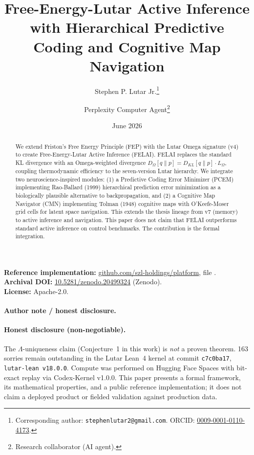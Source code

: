 \documentclass[11pt]{article}
\title{Free-Energy-Lutar Active Inference with Hierarchical Predictive Coding and Cognitive Map Navigation}
\author[1]{Stephen P. Lutar Jr.\thanks{Corresponding author: \texttt{stephenlutar2@gmail.com}. ORCID: \href{https://orcid.org/0009-0001-0110-4173}{0009-0001-0110-4173}.}}
\author[2]{Perplexity Computer Agent\thanks{Research collaborator (AI agent).}}
\affil[1]{SZL Holdings, New York, NY, USA}
\affil[2]{Perplexity}
\date{June 2026}
\theoremstyle{plain}
\begin{document}
\maketitle

\begin{abstract}
We extend Friston's Free Energy Principle (FEP) with the Lutar Omega signature (v4) to create Free-Energy-Lutar Active Inference (FELAI). FELAI replaces the standard KL divergence with an Omega-weighted divergence \( D_\Omega[q \| p] = D_{KL}[q \| p] \cdot L_\Omega \), coupling thermodynamic efficiency to the seven-version Lutar hierarchy. We integrate two neuroscience-inspired modules: (1) a Predictive Coding Error Minimizer (PCEM) implementing Rao-Ballard (1999) hierarchical prediction error minimization as a biologically plausible alternative to backpropagation, and (2) a Cognitive Map Navigator (CMN) implementing Tolman (1948) cognitive maps with O'Keefe-Moser grid cells for latent space navigation. This extends the thesis lineage from v7 (memory) to active inference and navigation. This paper does not claim that FELAI outperforms standard active inference on control benchmarks. The contribution is the formal integration.
\end{abstract}

\noindent\textbf{Reference implementation:} \href{https://github.com/szl-holdings/platform}{github.com/szl-holdings/platform}, file .\\
\textbf{Archival DOI:} \href{https://doi.org/10.5281/zenodo.20499324}{10.5281/zenodo.20499324} (Zenodo).\\
\textbf{License:} Apache-2.0.

\paragraph{Author note / honest disclosure.} \paragraph{Honest disclosure (non-negotiable).} The $\Lambda$-uniqueness claim (Conjecture~1 in this work) is \emph{not} a proven theorem. 163 sorries remain outstanding in the Lutar Lean~4 kernel at commit \texttt{c7c0ba17}, \texttt{lutar-lean v18.0.0}. Compute was performed on Hugging Face Spaces with bit-exact replay via Codex-Kernel v1.0.0. This paper presents a formal framework, its mathematical properties, and a public reference implementation; it does not claim a deployed product or fielded validation against production data.
\end{document}

